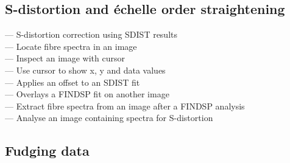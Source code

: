 
\subsection{\label{classifdistort}S-distortion and \'echelle order straightening}

 --- S-distortion correction using SDIST results\\
 --- Locate fibre spectra in an image\\
 --- Inspect an image with cursor\\
 --- Use cursor to show x, y and data values\\
 --- Applies an offset to an SDIST fit\\
 --- Overlays a FINDSP fit on another image\\
 --- Extract fibre spectra from an image after a FINDSP analysis\\
 --- Analyse an image containing spectra for S-distortion


\subsection{\label{classiffudge}Fudging data}

